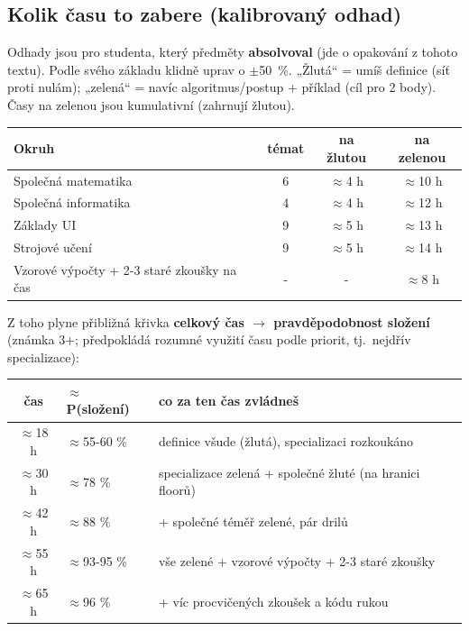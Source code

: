 \documentclass[11pt,a4paper]{article}
\begin{document}
\subsection{Kolik času to zabere (kalibrovaný odhad)}
{\small Odhady jsou pro studenta, který předměty \textbf{absolvoval} (jde o opakování z tohoto
textu). Podle svého základu klidně uprav o $\pm$50~\%. „Žlutá“ = umíš definice (síť proti
nulám); „zelená“ = navíc algoritmus/postup + příklad (cíl pro 2 body). Časy na zelenou jsou
kumulativní (zahrnují žlutou).}

\begin{center}\small
\begin{tabular}{@{}lccc@{}}
\toprule
\textbf{Okruh} & \textbf{témat} & \textbf{na žlutou} & \textbf{na zelenou} \\
\midrule
Společná matematika & 6 & $\approx$4 h & $\approx$10 h \\
Společná informatika & 4 & $\approx$4 h & $\approx$12 h \\
Základy UI & 9 & $\approx$5 h & $\approx$13 h \\
Strojové učení & 9 & $\approx$5 h & $\approx$14 h \\
Vzorové výpočty + 2-3 staré zkoušky na čas & - & - & $\approx$8 h \\
\bottomrule
\end{tabular}
\end{center}

\noindent Z toho plyne přibližná křivka \textbf{celkový čas $\to$ pravděpodobnost složení}
(známka 3+; předpokládá rozumné využití času podle priorit, tj.\ nejdřív specializace):

\begin{center}\small
\begin{tabular}{@{}cll@{}}
\toprule
\textbf{čas} & \textbf{$\approx$P(složení)} & \textbf{co za ten čas zvládneš} \\
\midrule
$\approx$18 h & $\approx$55-60 \% & definice všude (žlutá), specializaci rozkoukáno \\
$\approx$30 h & $\approx$78 \% & specializace zelená + společné žluté (na hranici floorů) \\
$\approx$42 h & $\approx$88 \% & + společné téměř zelené, pár drilů \\
$\approx$55 h & $\approx$93-95 \% & vše zelené + vzorové výpočty + 2-3 staré zkoušky \\
$\approx$65 h & $\approx$96 \% & + víc procvičených zkoušek a kódu rukou \\
\bottomrule
\end{tabular}
\end{center}
\end{document}
